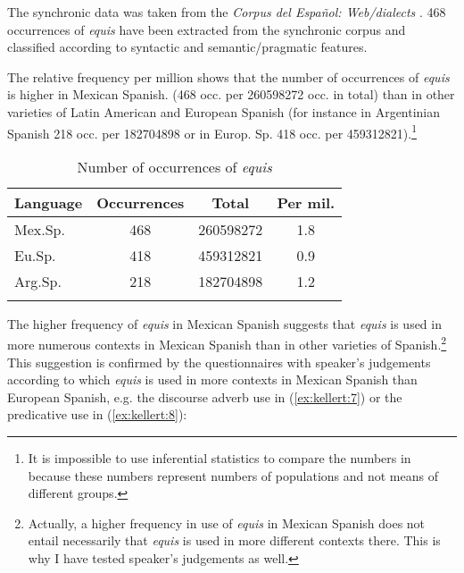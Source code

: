 \documentclass[output=paper]{langsci/langscibook}
\begin{document}
The synchronic data was taken from the \textit{Corpus del Español: Web\slash dialects} \citep{CDE}. 468 occurrences of \textit{equis} have been extracted from the synchronic corpus and classified according to syntactic and semantic/pragmatic features.

The relative frequency per million shows that the number of occurrences of \textit{equis} is higher in Mexican Spanish. (468 occ. per 260598272 occ. in total) than in other varieties of Latin American and European Spanish (for instance in Argentinian Spanish 218 occ. per 182704898 or in Europ. Sp. 418 occ. per 459312821).\footnote{It is impossible to use inferential statistics to compare the numbers in  because these numbers represent numbers of populations and not means of different groups.}

\vfill
\begin{table}
\caption{Number of occurrences of \textit{equis}\label{tab:kellert:numbers}}
\begin{tabular}{lS[table-format=3.0]S[table-format=9.0]S[table-format=1.1]}
\lsptoprule
Language & {Occurrences} & {Total} & {Per mil.}\\\midrule
Mex.Sp. & 468 & 260598272 & 1.8\\
Eu.Sp.  & 418 & 459312821 & 0.9\\
Arg.Sp. & 218 & 182704898 & 1.2\\
\lspbottomrule
\end{tabular}
\end{table}
\vfill
\pagebreak

The higher frequency of \textit{equis} in Mexican Spanish suggests that \textit{equis} is used in more numerous contexts in Mexican Spanish than in other varieties of Spanish.\footnote{Actually, a higher frequency in use of \textit{equis} in Mexican Spanish does not entail necessarily that \textit{equis} is used in more different contexts there. This is why I have tested speaker’s judgements as well.}  This suggestion is confirmed by the questionnaires with speaker's judgements according to which \textit{equis} is used in more contexts in Mexican Spanish than European Spanish, e.g. the discourse adverb use in (\ref{ex:kellert:7}) or the predicative use in (\ref{ex:kellert:8}):
\end{document}
